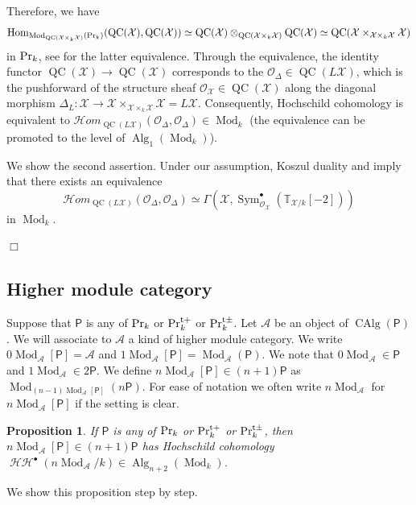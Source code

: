 \documentclass[leqno,12pt]{amsart}
\theoremstyle{plain}
\newtheorem{Proposition}[Theorem]{Proposition}
\theoremstyle{definition}
\newcommand{\HH}{\operatorname{\mathcal{HH}}}
\newcommand{\AAA}{\mathcal{A}}
\newcommand{\PR}{\textup{Pr}}
\newcommand{\PRTT}{\textup{Pr}^{\textup{t}+}}
\newcommand{\PRTTT}{\textup{Pr}^{\textup{t}\pm}}
\newcommand{\OO}{{\mathcal{O}}}
\newcommand{\Hom}{\operatorname{Hom}}
\newcommand{\Mod}{\operatorname{Mod}}
\newcommand{\Alg}{\operatorname{Alg}}
\newcommand{\CAlg}{\operatorname{CAlg}}
\newcommand{\QC}{\operatorname{QC}}
\newcommand{\XX}{\mathcal{X}}
\newcommand{\Sym}{\operatorname{Sym}}
\newcommand{\QED}{{\unskip\nobreak\hfil\penalty50\quad\null\nobreak\hfil
{$\Box$}\parfillskip0pt\finalhyphendemerits0\par\medskip}}
\begin{document}
Therefore, we have
\[
\Hom_{\Mod_{\QC(\mathcal{X}\times_k \mathcal{X})}(\PR_k)}(\QC(\mathcal{X}),\QC(\mathcal{X}))\simeq \QC(\mathcal{X})\otimes_{\QC(\mathcal{X}\times_k \mathcal{X})}\QC(\mathcal{X})\simeq \QC(\mathcal{X}\times_{\mathcal{X}\times_k\mathcal{X}}\mathcal{X})
\]
in $\PR_k$, see \cite[Theorem 4.7]{BFN} for the latter equivalence.
Through the equivalence,
the identity functor $\QC(\XX)\to \QC(\XX)$ corresponds to the $\OO_{\Delta}\in \QC(L\XX)$, which is the pushforward of the structure sheaf $\OO_{\mathcal{X}}\in \QC(\XX)$
along the diagonal morphism $\Delta_L:\XX\to \XX\times_{\XX\times_k\XX}\XX=L\XX$.
Consequently, Hochschild cohomology is equivalent to $\mathcal{H}om_{\QC(L\XX)}(\OO_{\Delta},\OO_\Delta)\in \Mod_k$ (the equivalence can be promoted to the level of $\Alg_1(\Mod_k)$).

We show the second assertion.
Under our assumption,  Koszul duality \cite{MR} and \cite{H} imply that
there exists an equivalence
\[
\mathcal{H}om_{\QC(L\XX)}(\OO_{\Delta},\OO_\Delta)\simeq  \Gamma(\XX,\Sym_{\OO_{\XX}}^{\bullet}(\mathbb{T}_{\XX/k}[-2]))
\]
in $\Mod_k$.
\QED



\subsection{Higher module category}



Suppose that $\mathsf{P}$ is any of $\PR_k$ or $\PRTT_k$ or $\PRTTT_k$.
Let $\mathcal{A}$ be an object of $\CAlg(\mathsf{P})$.
We will associate to $\AAA$ a kind of higher module category.
We write $0\Mod_{\AAA}[\mathsf{P}]=\AAA$ and $1\Mod_{\AAA}[\mathsf{P}]=\Mod_{\AAA}(\mathsf{P})$.  We note that $0\Mod_{\AAA}\in \mathsf{P}$ and $1\Mod_{\AAA}\in 2\mathsf{P}$. 
We define $n\Mod_{\AAA}[\mathsf{P}]\in (n+1)\mathsf{P}$ as $\Mod_{(n-1)\Mod_{\AAA}[\mathsf{P}]}(n\mathsf{P})$.
For ease of notation we often write $n\Mod_{\AAA}$ for $n\Mod_{\AAA}[\mathsf{P}]$ if the setting is clear.

\begin{Proposition}
\label{highermodulehoch}
If $\mathsf{P}$ is any of $\PR_k$ or $\PRTT_k$ or $\PRTTT_k$,
then $n\Mod_{\AAA}[\mathsf{P}]\in (n+1)\mathsf{P}$ has Hochschild cohomology $\HH^\bullet(n\Mod_{\AAA}/k)\in \Alg_{n+2}(\Mod_k)$.
\end{Proposition}

We show this proposition step by step. 
\end{document}

